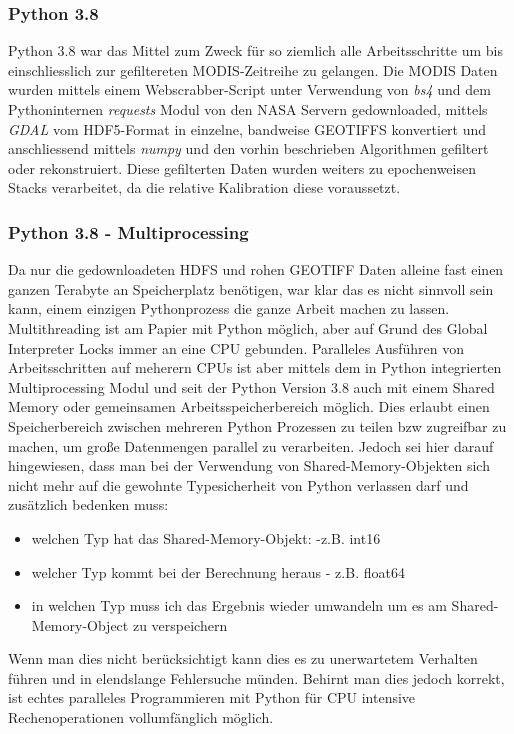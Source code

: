 \documentclass[11pt]{report}
\begin{document}
\subsubsection{Python 3.8}
Python 3.8 war das Mittel zum Zweck für so ziemlich alle Arbeitsschritte um bis einschliesslich zur gefiltereten MODIS-Zeitreihe zu gelangen. Die MODIS Daten wurden mittels einem Webscrabber-Script unter Verwendung von \emph{bs4} und dem Pythoninternen \emph{requests} Modul von den NASA Servern gedownloaded, mittels \emph{GDAL} vom HDF5-Format in einzelne, bandweise GEOTIFFS konvertiert und anschliessend mittels \emph{numpy} und den vorhin beschrieben Algorithmen gefiltert oder rekonstruiert. Diese gefilterten Daten wurden weiters zu epochenweisen Stacks verarbeitet, da die relative Kalibration diese voraussetzt.
\subsubsection{Python 3.8 - Multiprocessing}
Da nur die gedownloadeten HDFS und rohen GEOTIFF Daten alleine fast einen ganzen Terabyte an Speicherplatz benötigen, war klar das es nicht sinnvoll sein kann, einem einzigen Pythonprozess die ganze Arbeit machen zu lassen. Multithreading ist am Papier mit Python möglich, aber auf Grund des Global Interpreter Locks immer an eine CPU gebunden. Paralleles Ausführen von Arbeitsschritten auf meherern CPUs ist aber mittels dem in Python integrierten Multiprocessing Modul und seit der Python Version 3.8 auch mit einem Shared Memory oder gemeinsamen Arbeitsspeicherbereich möglich. Dies erlaubt einen Speicherbereich zwischen mehreren Python Prozessen zu teilen bzw zugreifbar zu machen, um große Datenmengen parallel zu verarbeiten. Jedoch sei hier darauf hingewiesen, dass man bei der Verwendung von Shared-Memory-Objekten sich nicht mehr auf die gewohnte Typesicherheit von Python verlassen darf und zusätzlich bedenken muss: 
\begin{itemize}
\item welchen Typ hat das Shared-Memory-Objekt: -z.B. int16
\item welcher Typ kommt bei der Berechnung heraus - z.B. float64
\item in welchen Typ muss ich das Ergebnis wieder umwandeln um es am Shared-Memory-Object zu verspeichern
\end{itemize}
Wenn man dies nicht berücksichtigt kann dies es zu unerwartetem Verhalten führen und in elendslange Fehlersuche münden. Behirnt man dies jedoch korrekt, ist echtes paralleles Programmieren mit Python für CPU intensive Rechenoperationen vollumfänglich möglich.
\end{document}

